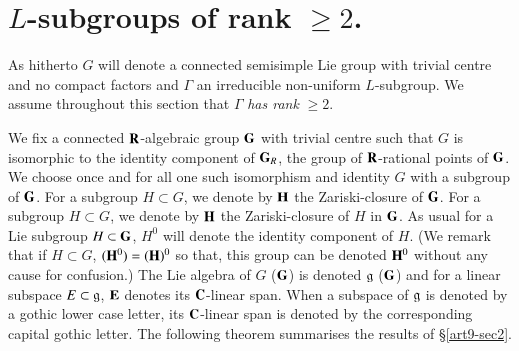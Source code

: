 \section{$L$-subgroups of rank $\geqslant 2$.}\label{art9-sec4}
As hitherto $G$ will denote a connected semisimple Lie group with trivial centre and no compact factors and $\Gamma$ an irreducible non-uniform $L$-subgroup. We assume throughout this section that $\Gamma$ \textit{has rank } $\geqslant 2$.

\begin{notation}\label{art9-nota4.1}
We fix a connected $\mathbf{R}$-algebraic group $\mathbf{G}$ with trivial centre such that $G$ is isomorphic to the identity component of $\mathbf{G}_R$, the group of $\mathbf{R}$-rational points of $\mathbf{G}$. We choose once and for all one such isomorphism and identity $G$ with a subgroup of $\mathbf{G}$. For a subgroup $H \subset G$, we denote by $\mathbf{H}$ the Zariski-closure of $\mathbf{G}$. For a subgroup $H \subset G$, we denote by $\mathbf{H}$ the Zariski-closure of $H$ in $\mathbf{G}$. As usual for a Lie subgroup $H \subset \mathbf{G}$, $H^0$ will denote the identity component of $H$. (We remark that if $H \subset G$, $(\mathbf{H}^0) = (\mathbf{H})^0$ so that, this group can be denoted $\mathbf{H}^0$ without any cause for confusion.)   The Lie algebra of $G$ (\resp $\mathbf{G}$) is denoted $\mathfrak{g}$ (\resp $\mathbf{G}$) and for a linear subspace $E \subset \mathfrak{g}$, $\mathbf{E}$ denotes its $\mathbf{C}$-linear span. When a subspace of $\mathfrak{g}$ is denoted by a gothic lower case letter, its $\mathbf{C}$-linear span is denoted by the corresponding capital gothic letter. The following theorem summarises the results of \S \ref{art9-sec2}.
\end{notation}

